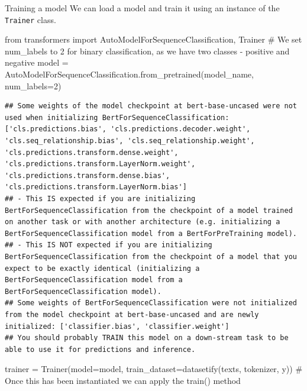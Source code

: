 \documentclass[
  10pt,
  ignorenonframetext,
  aspectratio=169]{beamer}
\newenvironment{Shaded}{\begin{snugshade}}{\end{snugshade}}
\newcommand{\CommentTok}[1]{\textcolor[rgb]{0.50,0.62,0.50}{#1}}
\newcommand{\DecValTok}[1]{\textcolor[rgb]{0.86,0.86,0.80}{#1}}
\newcommand{\ImportTok}[1]{\textcolor[rgb]{0.80,0.80,0.80}{#1}}
\newcommand{\NormalTok}[1]{\textcolor[rgb]{0.80,0.80,0.80}{#1}}
\newcommand{\OperatorTok}[1]{\textcolor[rgb]{0.94,0.94,0.82}{#1}}
\begin{document}
\begin{frame}[fragile]{Training a model}
\protect\hypertarget{training-a-model}{}
We can load a model and train it using an instance of the
\texttt{Trainer} class.

\medskip
\scriptsize

\begin{Shaded}
\begin{Highlighting}[]
\ImportTok{from}\NormalTok{ transformers }\ImportTok{import}\NormalTok{ AutoModelForSequenceClassification, Trainer}
\CommentTok{\# We set num\_labels to 2 for binary classification, as we have two classes {-} positive and negative}
\NormalTok{model }\OperatorTok{=}\NormalTok{ AutoModelForSequenceClassification.from\_pretrained(model\_name, num\_labels}\OperatorTok{=}\DecValTok{2}\NormalTok{)}
\end{Highlighting}
\end{Shaded}

\begin{verbatim}
## Some weights of the model checkpoint at bert-base-uncased were not used when initializing BertForSequenceClassification: ['cls.predictions.bias', 'cls.predictions.decoder.weight', 'cls.seq_relationship.bias', 'cls.seq_relationship.weight', 'cls.predictions.transform.dense.weight', 'cls.predictions.transform.LayerNorm.weight', 'cls.predictions.transform.dense.bias', 'cls.predictions.transform.LayerNorm.bias']
## - This IS expected if you are initializing BertForSequenceClassification from the checkpoint of a model trained on another task or with another architecture (e.g. initializing a BertForSequenceClassification model from a BertForPreTraining model).
## - This IS NOT expected if you are initializing BertForSequenceClassification from the checkpoint of a model that you expect to be exactly identical (initializing a BertForSequenceClassification model from a BertForSequenceClassification model).
## Some weights of BertForSequenceClassification were not initialized from the model checkpoint at bert-base-uncased and are newly initialized: ['classifier.bias', 'classifier.weight']
## You should probably TRAIN this model on a down-stream task to be able to use it for predictions and inference.
\end{verbatim}

\begin{Shaded}
\begin{Highlighting}[]
\NormalTok{trainer }\OperatorTok{=}\NormalTok{ Trainer(model}\OperatorTok{=}\NormalTok{model, train\_dataset}\OperatorTok{=}\NormalTok{datasetify(texts, tokenizer, y))}
\CommentTok{\# Once this has been instantiated we can apply the train() method}
\end{Highlighting}
\end{Shaded}


\end{frame}
\end{document}
